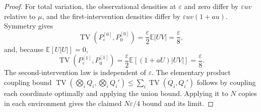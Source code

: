 \documentclass{article}
\begin{document}
\begin{proof}
For total variation, the observational densities at \(\varepsilon\) and zero differ by \(\varepsilon uv\) relative to \(\mu\), and the first-intervention densities differ by \(\varepsilon uv(1+au)\).  Symmetry gives
\[
 \operatorname{TV}(P_{\varepsilon}^{[0]},P_0^{[0]})
 =\frac{\varepsilon}{2}\mathbb E|UV|=\frac{\varepsilon}{8},
\]
and, because \(\mathbb E[U|U|]=0\),
\[
 \operatorname{TV}(P_{\varepsilon}^{[1]},P_0^{[1]})
 =\frac{\varepsilon}{2}\mathbb E[(1+aU)|UV|]
 =\frac{\varepsilon}{8}.
\]
The second-intervention law is independent of \(\varepsilon\).  The elementary product coupling bound
\(
\operatorname{TV}(\bigotimes_iQ_i,\bigotimes_iQ_i')
\le\sum_i\operatorname{TV}(Q_i,Q_i')
\)
follows by coupling each coordinate optimally and applying the union bound.  Applying it to \(N\) copies in each environment gives the claimed \(N\varepsilon/4\) bound and its limit.
\end{proof}
\end{document}
